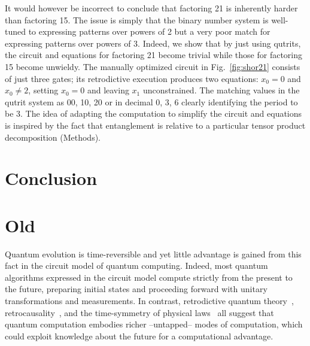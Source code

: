 \documentclass[sigplan]{acmart}
\begin{document}
It would however be incorrect to conclude that factoring 21 is
inherently harder than factoring 15. The issue is simply that the
binary number system is well-tuned to expressing patterns over powers
of 2 but a very poor match for expressing patterns over powers of
3. Indeed, we show that by just using qutrits, the circuit and
equations for factoring 21 become trivial while those for factoring 15
become unwieldy. The manually optimized circuit in
Fig.~\ref{fig:shor21} consists of just three gates; its retrodictive
execution produces two equations: $x_0=0$ and $x_0 \neq 2$, setting
$x_0=0$ and leaving $x_1$ unconstrained. The matching values in the
qutrit system as 00, 10, 20 or in decimal 0, 3, 6 clearly identifying
the period to be 3. The idea of adapting the computation to simplify
the circuit and equations is inspired by the fact that entanglement is
relative to a particular tensor product decomposition (Methods).

\section{Conclusion}

\section{Old}

Quantum evolution is time-reversible and yet little
advantage is gained from this fact in the circuit model of quantum
computing. Indeed, most quantum algorithms expressed in the circuit
model compute strictly from the present to the future, preparing
initial states and proceeding forward with unitary transformations and
measurements. In contrast, retrodictive quantum
theory~\cite{sym13040586}, retrocausality~\cite{Aharonov2008}, and the
time-symmetry of physical laws~\cite{RevModPhys.27.179} all suggest
that quantum computation embodies richer --untapped-- modes of
computation, which could exploit knowledge about the future for a
computational advantage.
\end{document}

